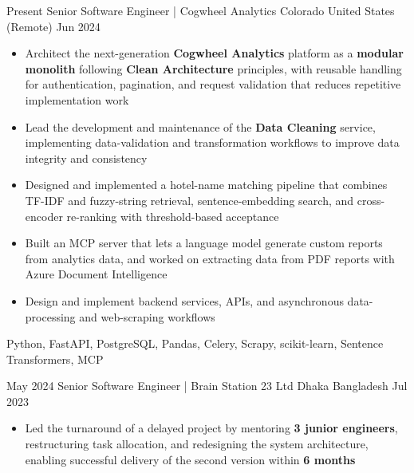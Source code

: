 %
%
%


\begin{experiences}

    \experience
    {Present}
    {Senior Software Engineer | Cogwheel Analytics}
    {Colorado}
    {United States (Remote)}
    {Jun 2024}
    {
        \begin{itemize}
            \item Architect the next-generation \textbf{Cogwheel Analytics} platform as a
                  \textbf{modular monolith} following \textbf{Clean Architecture} principles,
                  with reusable handling for authentication, pagination, and request
                  validation that reduces repetitive implementation work
            \item Lead the development and maintenance of the \textbf{Data Cleaning}
                  service, implementing data-validation and transformation workflows
                  to improve data integrity and consistency

            \item Designed and implemented a hotel-name matching pipeline that combines
                  TF-IDF and fuzzy-string retrieval, sentence-embedding search, and
                  cross-encoder re-ranking with threshold-based acceptance

            \item Built an MCP server that lets a language model generate custom reports
                  from analytics data, and worked on extracting data from PDF reports with
                  Azure Document Intelligence

            \item Design and implement backend services, APIs, and asynchronous
                  data-processing and web-scraping workflows
        \end{itemize}
    }
    {Python, FastAPI, PostgreSQL, Pandas, Celery, Scrapy, scikit-learn, Sentence Transformers, MCP}
    
    \emptySeparator

    \experience
        {May 2024}
        {Senior Software Engineer | Brain Station 23 Ltd}
        {Dhaka}
        {Bangladesh}
        {Jul 2023}
        {
            \begin{itemize}
                \item Led the turnaround of a delayed project by mentoring
                      \textbf{3 junior engineers}, restructuring task allocation,
                      and redesigning the system architecture, enabling successful
                      delivery of the second version within \textbf{6 months}


\end{itemize}}
\end{experiences}
